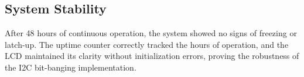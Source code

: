 \subsection{System Stability}
After 48 hours of continuous operation, the system showed no signs of freezing or latch-up. The uptime counter correctly tracked the hours of operation, and the LCD maintained its clarity without initialization errors, proving the robustness of the I2C bit-banging implementation.
